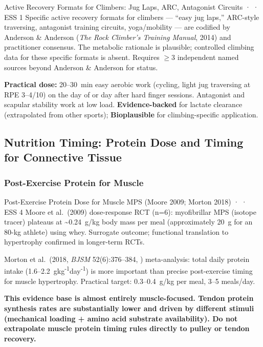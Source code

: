 \begin{toverifybox}{Active Recovery Formats for Climbers: Jug Laps, ARC, Antagonist Circuits · \toverify · ESS 1}
Specific active recovery formats for climbers --- ``easy jug laps,'' ARC-style traversing, antagonist training circuits, yoga/mobility --- are codified by Anderson \& Anderson (\emph{The Rock Climber's Training Manual}, 2014) and practitioner consensus. The metabolic rationale is plausible; controlled climbing data for these specific formats is absent. Requires $\geq$3 independent named sources beyond Anderson \& Anderson for \folkloreverified status.
\end{toverifybox}

\textbf{Practical dose:} 20--30~min easy aerobic work (cycling, light jug traversing at RPE 3--4/10) on the day of or day after hard finger sessions. Antagonist and scapular stability work at low load. \textbf{Evidence-backed} for lactate clearance (extrapolated from other sports); \textbf{Bioplausible} for climbing-specific application.

\subsection{Nutrition Timing: Protein Dose and Timing for Connective Tissue}

\subsubsection*{Post-Exercise Protein for Muscle}

\begin{evidencebox}{Post-Exercise Protein Dose for Muscle MPS (Moore 2009; Morton 2018) · \evidencebacked · ESS 4}
Moore et al.\ (2009) dose-response RCT (n=6): myofibrillar MPS (isotope tracer) plateaus at \textasciitilde{}0.24~g/kg body mass per meal (approximately 20~g for an 80-kg athlete) using whey. Surrogate outcome; functional translation to hypertrophy confirmed in longer-term RCTs. \cite{MRF+09}

Morton et al.\ (2018, \emph{BJSM} 52(6):376--384, \cite{MMM+17}) meta-analysis: total daily protein intake (1.6--2.2~g\textperiodcentered{}kg\textsuperscript{-1}\textperiodcentered{}day\textsuperscript{-1}) is more important than precise post-exercise timing for muscle hypertrophy. Practical target: 0.3--0.4~g/kg per meal, 3--5 meals/day.

\textbf{This evidence base is almost entirely muscle-focused. Tendon protein synthesis rates are substantially lower and driven by different stimuli (mechanical loading + amino acid substrate availability). Do not extrapolate muscle protein timing rules directly to pulley or tendon recovery.}
\end{evidencebox}

